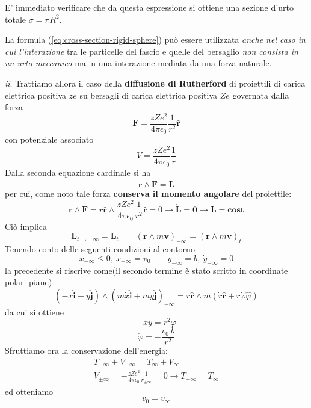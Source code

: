 E' immediato verificare che da questa espressione si ottiene una sezione d'urto totale $\sigma = \pi R^2$.


La formula (\ref{eq:cross-section-rigid-sphere}) può essere utilizzata \emph{anche nel caso in cui l'interazione} tra le
particelle del fascio e quelle del bersaglio \emph{non consista in un urto meccanico} ma in una interazione mediata da una
forza naturale.

 \emph{ii}.
Trattiamo allora il caso della \textbf{diffusione di Rutherford} di proiettili di carica elettrica positiva $ze$ su 
bersagli di carica elettrica positiva $Ze$ governata dalla forza
\[
	\bm{F} = \frac{zZe^2}{4 \pi \epsilon_0}\frac{1}{r^2}\hat{\bm{r}}
\]
con potenziale associato 
\[
    V = \frac{zZ {e}^{2}}{4 \pi \epsilon_0 } \frac{1}{r}
\]
Dalla seconda equazione cardinale si ha
\[
      \bm{r} \wedge \bm{F} = \dot{\bm{L}}
\]
per cui, come noto tale forza \textbf{conserva il momento angolare} del proiettile:
\[
	  \bm{r} \wedge \bm{F} = r \hat{\bm{r}} \wedge \frac{zZe^2}{4 \pi \epsilon_0}\frac{1}{r^2}\hat{\bm{r}} = 0 \rightarrow
	  \dot{\bm{L}} = \bm{0} \rightarrow \bm{L} = \bm{cost}
\]
Ciò implica
\[
	\bm{L}_{t \to - \infty} = \bm{L}_t \qquad
	\left( \bm{r} \wedge m \bm{v} \right)_{- \infty} = \left( \bm{r} \wedge m \bm{v} \right)_{t}
\]
Tenendo conto delle seguenti condizioni al contorno
\[
    x_{ - \infty} \leq 0  , \ \dot{x}_{- \infty} = v_0 \qquad y_{- \infty} = b , \  \dot{y}_{- \infty} = 0
\]
la precedente si  riscrive come(il secondo termine è stato scritto in coordinate polari piane)
\[
	(-x \hat{\bm{i}} + y \hat{\bm{j}}) \wedge (m \dot{x} \hat{\bm{i}} + m \dot{y} \hat{\bm{j}})_{- \infty} =
	r \hat{\bm{r}} \wedge m(\dot{r}\hat{\bm{r}} + r \dot{\varphi}\hat{\varphi})
\]
da cui si ottiene
\[
   - \dot{x}y = {r}^{2} \dot{\varphi}
\]
\begin{equation}
	\dot{\varphi} = - \frac{v_0 \ b}{r^2}
	\label{eq:ex-cross-section2-1}
\end{equation}
Sfruttiamo ora la conservazione dell'energia:
\begin{gather*}
    T_{- \infty} + V_{- \infty} = T_{\infty} + V_{\infty}\\
    V_{\pm \infty} = - \frac{zZ {e}^{2}}{4 \pi \epsilon_0 } \frac{1}{r_{\pm \infty}} = 0 \rightarrow
	T_{- \infty}  = T_{\infty}
\end{gather*}
ed otteniamo
\begin{equation}
	v_0 = v_{\infty}
	\label{eq:ex-cross-section2-2}
\end{equation}
